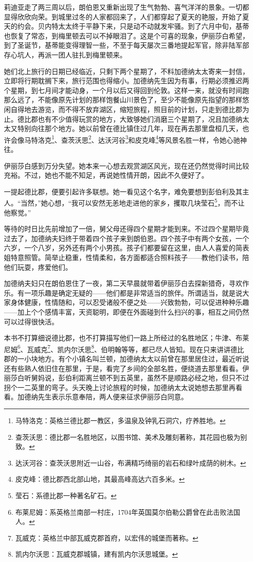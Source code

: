 \par 莉迪亚走了两三周以后，朗伯恩又重新出现了生气勃勃、喜气洋洋的景象。一切都显得欣欣向荣。到城里过冬的人家都回来了，人们都穿起了夏天的艳服，开始了夏天的约会。贝内特太太终于平静下来，只是动不动就发牢骚。到了六月中旬，基蒂也恢复了常态，到梅里顿去可以不掉眼泪了。这是个可喜的现象，伊丽莎白希望，到了圣诞节，基蒂能变得理智一些，不至于每天屡次三番地提起军官，除非陆军部存心坑人，再派一团人驻扎到梅里顿来。
\par 她们北上旅行的日期已经临近，只剩下两个星期了，不料加德纳太太寄来一封信，立即将行期耽搁下来，旅行范围也得缩小。加德纳先生因为有事，行期必须推迟两个星期，到七月间才能动身，一个月以后又得回到伦敦。这样一来，就没有时间跑那么远了，不能像原先计划的那样饱餐山川景色了，至少不能像原先指望的那样悠闲自得地去游览，而不得不放弃湖区，缩短旅程，照目前的计划，只走到德比郡为止。德比郡也有不少值得玩赏的地方，大致够她们消磨三个星期了，况且加德纳太太又特别向往那个地方。她以前曾在德比镇住过几年，现在再去那里盘桓几天，也许会像马特洛克\footnote{马特洛克：英格兰德比郡一教区，多温泉及钟乳石洞穴，疗养胜地。}、查茨沃思\footnote{查茨沃思：德比郡一名胜地区，以图书馆、美术及雕刻著称，其花园也极为别致。}、达沃河谷\footnote{达沃河谷：查茨沃思附近一山谷，布满精巧绮丽的岩石和绿叶成荫的树木。}和皮克峰\footnote{皮克峰：德比郡西北部山地，其最高峰高达六百多米。}等风景名胜一样，令她心驰神往。
\par 伊丽莎白感到万分失望。她本来一心想去观赏湖区风光，现在还仍然觉得时间比较充裕。不过，她也不能不知足，再说她性情开朗，因此不久便好了。
\par 一提起德比郡，便要引起许多联想。她一看见这个名字，难免要想到彭伯利及其主人。“当然，”她心想，“我可以安然无恙地走进他的家乡，攫取几块莹石\footnote{莹石：系德比郡一种著名矿石。}，而不让他察觉。”
\par 等待的时日比先前增加了一倍，舅父母还得四个星期才能到来。不过四个星期毕竟过去了，加德纳夫妇终于带着四个孩子来到朗伯恩。四个孩子中有两个女孩，一个六岁，一个八岁，另外还有两个小男孩。孩子们都要留在这里，由人人喜爱的简表姐特意照管。简举止稳重，性情柔和，各方面都适合照料孩子——教他们读书，陪他们玩耍，疼爱他们。
\par 加德纳夫妇只在朗伯恩住了一夜，第二天早晨就带着伊丽莎白去探新猎奇，寻欢作乐。有一项乐趣是确定无疑的——他们都是非常适当的旅伴。所谓适当，就是说大家身体健康，性情随和，可以忍受诸般不便之处——兴致勃勃，可以促进种种乐趣——加上个个感情丰富，天资聪明，即便在外面碰到什么扫兴的事，相互之间仍然可以过得很快活。
\par 本书不打算细说德比郡，也不打算描写他们一路上所经过的名胜地区；牛津、布莱尼姆\footnote{布莱尼姆：系英格兰南部一村庄，1704年英国莫尔伯勒公爵曾在此击败法国人。}、瓦威克\footnote{瓦威克：英格兰中部瓦威克郡首府，以宏伟的城堡而著称。}、凯内尔沃思\footnote{凯内尔沃思：瓦威克郡城镇，建有凯内尔沃思城堡。}、伯明翰等等，都已尽人皆知。现在只来讲讲德比郡的一小块地方。有个小镇名叫兰顿，加德纳太太以前曾在那里居住过，最近听说还有些熟人依旧住在那里，于是，看完了乡间的全部名胜，便绕道去那里看看。伊丽莎白听舅妈说，彭伯利距离兰顿不到五英里，虽然不是顺路必经之地，但只不过拐个一二英里的弯子。头天晚上讨论旅程的时候，加德纳太太说她想去那里再看看。加德纳先生表示乐意奉陪，两人便来征求伊丽莎白同意。
